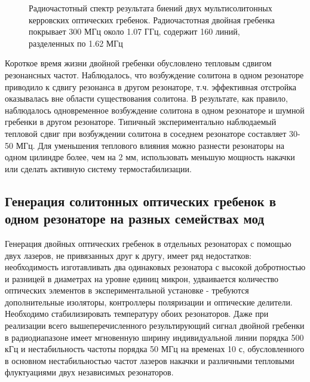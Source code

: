\begin{figure}[ht]
\begin{minipage}[ht]{1\linewidth}
\end{minipage}
\caption{Радиочастотный спектр результата биений двух мультисолитонных керровских оптических гребенок. Радиочастотная двойная гребенка покрывает 300 МГц около 1.07 ГГц, содержит 160 линий, разделенных по 1.62 МГц}
\label{ris:image4}
\end{figure}

Короткое время жизни двойной гребенки обусловлено тепловым сдвигом резонансных частот. Наблюдалось, что возбуждение солитона в одном резонаторе приводило к сдвигу резонанса в другом резонаторе, т.ч. эффективная отстройка оказывалась вне области существования солитона. В результате, как правило, наблюдалось одновременное возбуждение солитона в одном резонаторе и шумной гребенки в другом резонаторе. Типичный экспериментально наблюдаемый тепловой сдвиг при возбуждении солитона в соседнем резонаторе составляет 30-50 МГц. Для уменьшения теплового влияния можно разнести резонаторы на одном цилиндре более, чем на 2 мм, использовать меньшую мощность накачки или сделать активную систему термостабилизации.


\subsection{Генерация солитонных оптических гребенок в одном резонаторе на разных семействах мод}

Генерация двойных оптических гребенок в отдельных резонаторах с помощью двух лазеров, не привязанных друг к другу, имеет ряд недостатков: необходимость изготавливать два одинаковых резонатора с высокой добротностью и разницей в диаметрах на уровне единиц микрон, удваивается количество оптических элементов в экспериментальной установке - требуются дополнительные изоляторы, контроллеры поляризации и оптические делители. Необходимо стабилизировать температуру обоих резонаторов. Даже при реализации всего вышеперечисленного результирующий сигнал двойной гребенки в радиодиапазоне имеет мгновенную ширину индивидуальной линии порядка 500 кГц и нестабильность частоты порядка 50 МГц на временах 10 с, обусловленного в основном нестабильностью частот лазеров накачки и различными тепловыми флуктуациями двух независимых резонаторов.

